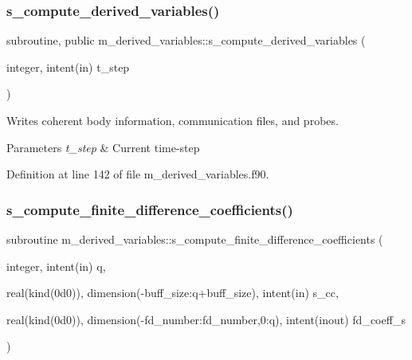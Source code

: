 \subsubsection{\texorpdfstring{s\+\_\+compute\+\_\+derived\+\_\+variables()}{s\_compute\_derived\_variables()}}
{\footnotesize\ttfamily subroutine, public m\+\_\+derived\+\_\+variables\+::s\+\_\+compute\+\_\+derived\+\_\+variables (\begin{DoxyParamCaption}\item[{integer, intent(in)}]{t\+\_\+step }\end{DoxyParamCaption})}



Writes coherent body information, communication files, and probes. 


\begin{DoxyParams}{Parameters}
{\em t\+\_\+step} & Current time-\/step \\
\hline
\end{DoxyParams}


Definition at line 142 of file m\+\_\+derived\+\_\+variables.\+f90.

\mbox{\label{namespacem__derived__variables_a908281ae7fe786ef19397e268ede0ece}} 
\subsubsection{\texorpdfstring{s\+\_\+compute\+\_\+finite\+\_\+difference\+\_\+coefficients()}{s\_compute\_finite\_difference\_coefficients()}}
{\footnotesize\ttfamily subroutine m\+\_\+derived\+\_\+variables\+::s\+\_\+compute\+\_\+finite\+\_\+difference\+\_\+coefficients (\begin{DoxyParamCaption}\item[{integer, intent(in)}]{q,  }\item[{real(kind(0d0)), dimension(-\/buff\+\_\+size\+:q+buff\+\_\+size), intent(in)}]{s\+\_\+cc,  }\item[{real(kind(0d0)), dimension(-\/fd\+\_\+number\+:fd\+\_\+number,0\+:q), intent(inout)}]{fd\+\_\+coeff\+\_\+s }\end{DoxyParamCaption})}



